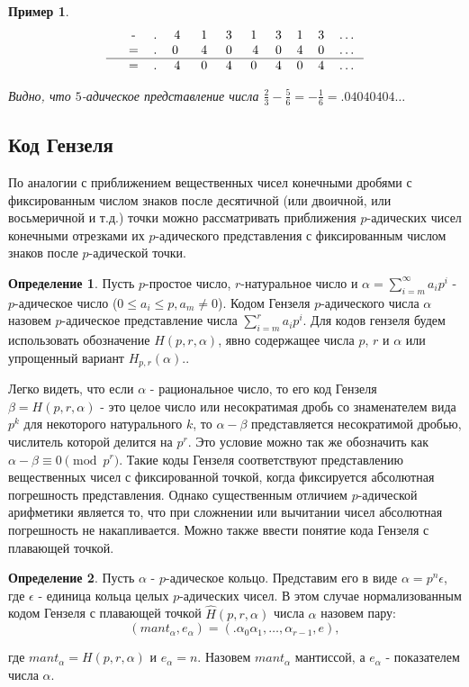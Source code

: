 \documentclass[master, och, diploma, times]{sty/SCWorks}
\theoremstyle{plain}
\newtheorem{exmp}{Пример}[section]
\theoremstyle{definition}
\newtheorem{defn}{Определение}[section]
\numberwithin{equation}{section}
\begin{document}
\begin{exmp}
$$
\begin{tabular}{cccccccccccc}
& - & . & 4\; & 1\; & 3\; & 1\; & 3 & 1 & 3 & \dots \\
& = & . & 0 \; & 4\; & 0\; & 4 & 0 & 4 & 0 & \dots \\
\hline
& = & . & 4\; & 0\; & 4\; & 0\; & 4 & 0 & 4 & \dots
\end{tabular}
$$

\noindent Видно, что $5$-адическое представление числа $\frac{2}{3} - \frac{5}{6}=-\frac{1}{6}=.04040404\dots$
\end{exmp}

\subsection{Код Гензеля}
По аналогии с приближением вещественных чисел конечными дробями с фиксированным числом знаков после десятичной (или двоичной, или восьмеричной и т.д.) точки можно рассматривать приближения $p$-адических чисел конечными отрезками их $p$-адического представления с фиксированным числом знаков после $p$-адической точки.

\begin{defn}
Пусть $p$-простое число, $r$-натуральное число и $\alpha=\sum\limits^{\infty}_{i=m} a_ip^i$ - $p$-адическое число ($0 \le a_i \le p, a_m \neq 0$). Кодом Гензеля $p$-адического числа $\alpha$ назовем $p$-адическое представление числа $\sum\limits_{i=m}^{r}a_ip^i$. Для кодов гензеля будем использовать обозначение $H(p,r,\alpha)$, явно содержащее числа $p$, $r$ и $\alpha$ или упрощенный вариант $H_{p,r}(\alpha)$.\cite{bib:analysis:gouvea}.
\end{defn}

Легко видеть, что если $\alpha$ - рациональное число, то его код Гензеля $\beta=H(p,r, \alpha)$ - это целое число или несократимая дробь со знаменателем вида $p^k$ для некоторого натурального $k$, то $\alpha-\beta$ представляется несократимой дробью, числитель которой делится на $p^r$. Это условие можно так же обозначить как $\alpha - \beta \equiv 0 \pmod {p^r}$.  Такие коды Гензеля соответствуют представлению вещественных чисел с фиксированной точкой, когда фиксируется абсолютная погрешность представления. Однако существенным отличием $p$-адической арифметики является то, что при сложнении или вычитании чисел абсолютная погрешность не накапливается. Можно также ввести понятие кода Гензеля с плавающей точкой.

\begin{defn}
Пусть $\alpha$ - $p$-адическое кольцо. Представим его в виде $\alpha=p^n\epsilon$, где $\epsilon$ - единица кольца целых $p$-адических чисел. В этом случае нормализованным кодом Гензеля с плавающей точкой $\hat H (p, r, \alpha)$ числа $\alpha$ назовем пару:
\begin{equation}
	(mant_{\alpha},e_{\alpha})=(.\alpha_0\alpha_1,\dots,\alpha_{r-1},e),
\end{equation}

\noindent где \mbox{$mant_\alpha = H(p,r,\alpha)$} и $e_\alpha=n$. Назовем $mant_\alpha$ мантиссой, а $e_\alpha$ - показателем числа $\alpha$.
\end{defn}
\end{document}
